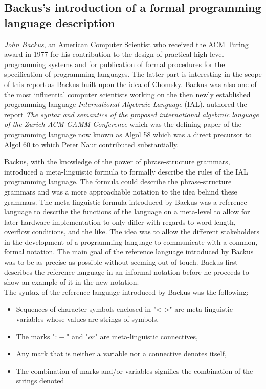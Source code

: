 \documentclass{article}
\begin{document}
\subsection{Backus's introduction of a formal programming language description}
\textit{John Backus}, an American Computer Scientist who received the ACM Turing award in 1977 for his contribution to the design of practical high-level programming systems and for publication of formal procedures for the specification of programming languages. The latter part is interesting in the scope of this report as Backus built upon the idea of Chomsky. Backus was also one of the most influential computer scientists working on the then newly established programming language \textit{International Algebraic Language} (IAL). \citet{Backus1959TheSA} authored the report \textit{The syntax and semantics of the proposed international algebraic language of the Zurich ACM-GAMM Conference} which was the defining paper of the programming language now known as Algol 58 which was a direct precursor to Algol 60 to which Peter Naur contributed substantially.

Backus, with the knowledge of the power of phrase-structure grammars, introduced a meta-linguistic formula to formally describe the rules of the IAL programming language. The formula could describe the phrase-structure grammars and was a more approachable notation to the idea behind these grammars. The meta-linguistic formula introduced by Backus was a reference language to describe the functions of the language on a meta-level to allow for later hardware implementation to only differ with regards to word length, overflow conditions, and the like. The idea was to allow the different stakeholders in the development of a programming language to communicate with a common, formal notation. The main goal of the reference language introduced by Backus was to be as precise as possible without seeming out of touch. Backus first describes the reference language in an informal notation before he proceeds to show an example of it in the new notation.
\\
The syntax of the reference language introduced by Backus was the following:
\begin{itemize}
	\item Sequences of character symbols enclosed in "< >" are meta-linguistic variables whose values are strings of symbols,
	\item The marks ":$\equiv$" and "$or$" are meta-linguistic connectives,
	\item Any mark that is neither a variable nor a connective denotes itself,
	\item The combination of marks and/or variables signifies the combination of the strings denoted
\end{itemize} 
\end{document}
